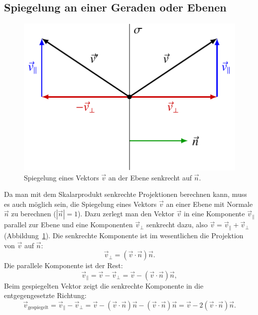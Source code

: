 \subsection{Spiegelung an einer Geraden oder Ebenen\label{spiegelung}}
\begin{figure}
\begin{center}
\includegraphics{4/images/spiegelung.pdf}
\end{center}
\caption{Spiegelung eines Vektors $\vec v$ an der Ebene senkrecht auf $\vec n$.
\label{image-spiegelung}}
\end{figure}
Da man mit dem Skalarprodukt senkrechte Projektionen berechnen kann,
muss es auch möglich sein, die Spiegelung eines Vektors $\vec v$
an einer Ebene mit Normale $\vec n$ zu berechnen ($|\vec n|=1$).
Dazu zerlegt man den Vektor $\vec v$ in eine Komponente $\vec v_{\|}$
parallel zur Ebene und eine Komponenten $\vec v_{\perp}$ senkrecht dazu,
also $\vec v=\vec v_{\|}+\vec v_{\perp}$ (Abbildung~\ref{image-spiegelung}).
Die senkrechte Komponente
ist im wesentlichen die Projektion von $\vec v$ auf $\vec n$:
\[
\vec v_{\perp}=
(\vec v\cdot\vec n)\vec n
.
\]
Die parallele Komponente ist der Rest:
\[
\vec v_{\|}=\vec v -\vec v_{\perp}=
\vec v-(\vec v\cdot\vec n)\vec n
,
\]
Beim gespiegelten Vektor zeigt die senkrechte Komponente in die
entgegengesetzte Richtung:
\begin{equation}
\vec v_{\text{gespiegelt}}=
\vec v_{\|}-\vec v_{\perp}
=
\vec v-(\vec v\cdot\vec n)\vec n
-
(\vec v\cdot\vec n)\vec n
=\vec v-2(\vec v\cdot\vec n)\vec n.
\label{equation:spiegelung}
\end{equation}


